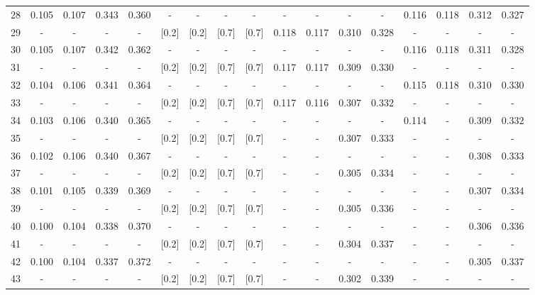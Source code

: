 \documentclass{report}
\begin{document}
\begin{appendices}
\begin{sidewaystable}
\begin{tabular}{|c|cccc|cccc|cccc|cccc|}
28 & 0.105 & 0.107 & 0.343 & 0.360 &   -   &   -   &   -   &   -   &   -   &   -   &   -   &   -   & 0.116 & 0.118 & 0.312 & 0.327\\
29 &   -   &   -   &   -   &   -   & [0.2] & [0.2] & [0.7] & [0.7] & 0.118 & 0.117 & 0.310 & 0.328 &   -   &   -   &   -   &   -  \\
30 & 0.105 & 0.107 & 0.342 & 0.362 &   -   &   -   &   -   &   -   &   -   &   -   &   -   &   -   & 0.116 & 0.118 & 0.311 & 0.328\\
31 &   -   &   -   &   -   &   -   & [0.2] & [0.2] & [0.7] & [0.7] & 0.117 & 0.117 & 0.309 & 0.330 &   -   &   -   &   -   &   -  \\
32 & 0.104 & 0.106 & 0.341 & 0.364 &   -   &   -   &   -   &   -   &   -   &   -   &   -   &   -   & 0.115 & 0.118 & 0.310 & 0.330\\
33 &   -   &   -   &   -   &   -   & [0.2] & [0.2] & [0.7] & [0.7] & 0.117 & 0.116 & 0.307 & 0.332 &   -   &   -   &   -   &   -  \\
34 & 0.103 & 0.106 & 0.340 & 0.365 &   -   &   -   &   -   &   -   &   -   &   -   &   -   &   -   & 0.114 &   -   & 0.309 & 0.332\\
35 &   -   &   -   &   -   &   -   & [0.2] & [0.2] & [0.7] & [0.7] &   -   &   -   & 0.307 & 0.333 &   -   &   -   &   -   &   -  \\
36 & 0.102 & 0.106 & 0.340 & 0.367 &   -   &   -   &   -   &   -   &   -   &   -   &   -   &   -   &   -   &   -   & 0.308 & 0.333\\
37 &   -   &   -   &   -   &   -   & [0.2] & [0.2] & [0.7] & [0.7] &   -   &   -   & 0.305 & 0.334 &   -   &   -   &   -   &   -  \\
38 & 0.101 & 0.105 & 0.339 & 0.369 &   -   &   -   &   -   &   -   &   -   &   -   &   -   &   -   &   -   &   -   & 0.307 & 0.334\\
39 &   -   &   -   &   -   &   -   & [0.2] & [0.2] & [0.7] & [0.7] &   -   &   -   & 0.305 & 0.336 &   -   &   -   &   -   &   -  \\
40 & 0.100 & 0.104 & 0.338 & 0.370 &   -   &   -   &   -   &   -   &   -   &   -   &   -   &   -   &   -   &   -   & 0.306 & 0.336\\
41 &   -   &   -   &   -   &   -   & [0.2] & [0.2] & [0.7] & [0.7] &   -   &   -   & 0.304 & 0.337 &   -   &   -   &   -   &   -  \\
42 & 0.100 & 0.104 & 0.337 & 0.372 &   -   &   -   &   -   &   -   &   -   &   -   &   -   &   -   &   -   &   -   & 0.305 & 0.337\\
43 &   -   &   -   &   -   &   -   & [0.2] & [0.2] & [0.7] & [0.7] &   -   &   -   & 0.302 & 0.339 &   -   &   -   &   -   &   -  \\

\end{tabular}
\end{sidewaystable}
\end{appendices}
\end{document}
